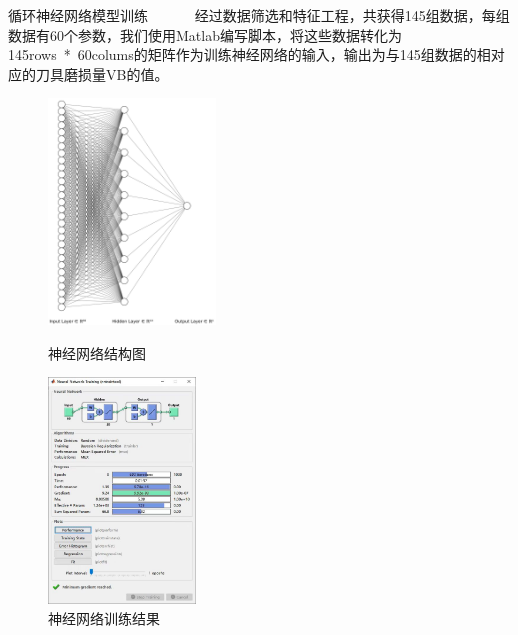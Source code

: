 \begin{frame}{循环神经网络模型训练}
\ \ \ \ \ \ 经过数据筛选和特征工程，共获得145组数据，每组数据有60个参数，我们使用Matlab编写脚本，将这些数据转化为145rows~*~60colums的矩阵作为训练神经网络的输入，输出为与145组数据的相对应的刀具磨损量VB的值。\par

\begin{figure}[htbp]

\begin{minipage}[t]{0.48\textwidth}
\centering
\includegraphics[height=6cm]{刀具磨损量预测神经网络/nn.png}

\caption{神经网络结构图}
\end{minipage}
\begin{minipage}[t]{0.48\textwidth}
\centering
\includegraphics[height=6cm]{刀具磨损量预测神经网络/res.jpg}
\caption{神经网络训练结果}

\end{minipage}
\end{figure}

% 
\end{frame}
